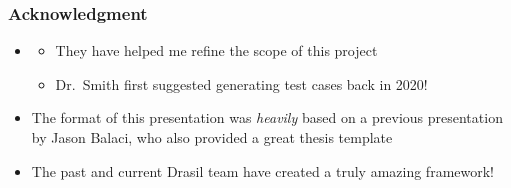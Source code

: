 \documentclass{beamer}
\begin{document}

%   




\begin{frame}
    \frametitle{Acknowledgment}

    \begin{itemize}
        \item \supersAck{}
              \begin{itemize}
                  \item They have helped me refine the scope of this project
                  \item Dr.~Smith first suggested generating test cases back in 2020!
              \end{itemize}
        \item<2-> The format of this presentation was \emph{heavily} based on
              a previous presentation by Jason Balaci, who also provided a
              great thesis template
        \item<3-> The past and current Drasil team have created a truly amazing
              framework!
    \end{itemize}
\end{frame}

\end{document}
